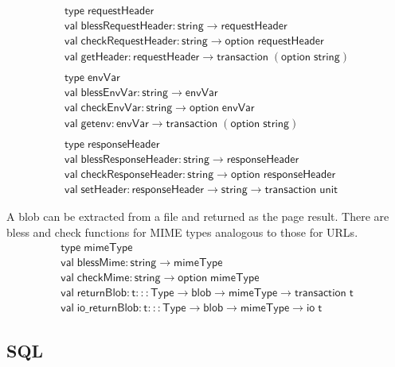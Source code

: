 \documentclass{article}
\newcommand{\mt}[1]{\mathsf{#1}}
\begin{document}
$$\begin{array}{l}
  \mt{type} \; \mt{requestHeader} \\
  \mt{val} \; \mt{blessRequestHeader} : \mt{string} \to \mt{requestHeader} \\
  \mt{val} \; \mt{checkRequestHeader} : \mt{string} \to \mt{option} \; \mt{requestHeader} \\
  \mt{val} \; \mt{getHeader} : \mt{requestHeader} \to \mt{transaction} \; (\mt{option} \; \mt{string}) \\
  \\
  \mt{type} \; \mt{envVar} \\
  \mt{val} \; \mt{blessEnvVar} : \mt{string} \to \mt{envVar} \\
  \mt{val} \; \mt{checkEnvVar} : \mt{string} \to \mt{option} \; \mt{envVar} \\
  \mt{val} \; \mt{getenv} : \mt{envVar} \to \mt{transaction} \; (\mt{option} \; \mt{string}) \\
  \\
  \mt{type} \; \mt{responseHeader} \\
  \mt{val} \; \mt{blessResponseHeader} : \mt{string} \to \mt{responseHeader} \\
  \mt{val} \; \mt{checkResponseHeader} : \mt{string} \to \mt{option} \; \mt{responseHeader} \\
  \mt{val} \; \mt{setHeader} : \mt{responseHeader} \to \mt{string} \to \mt{transaction} \; \mt{unit}
\end{array}$$

A blob can be extracted from a file and returned as the page result.  There are bless and check functions for MIME types analogous to those for URLs.
$$\begin{array}{l}
  \mt{type} \; \mt{mimeType} \\
  \mt{val} \; \mt{blessMime} : \mt{string} \to \mt{mimeType} \\
  \mt{val} \; \mt{checkMime} : \mt{string} \to \mt{option} \; \mt{mimeType} \\
  \mt{val} \; \mt{returnBlob} : \mt{t} ::: \mt{Type} \to \mt{blob} \to \mt{mimeType} \to \mt{transaction} \; \mt{t} \\
  \mt{val} \; \mt{io\_returnBlob} : \mt{t} ::: \mt{Type} \to \mt{blob} \to \mt{mimeType} \to \mt{io} \; \mt{t}
\end{array}$$


\subsection{SQL}
\end{document}
